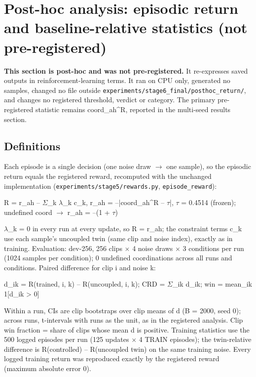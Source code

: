 \documentclass[conference]{IEEEtran}
\begin{document}
\section{Post-hoc analysis: episodic return and baseline-relative statistics (not pre-registered)}
\textbf{This section is post-hoc and was not pre-registered.} It re-expresses saved outputs in reinforcement-learning terms. It ran on CPU only, generated no samples, changed no file outside \texttt{experiments/stage6\_final/posthoc\_return/}, and changes no registered threshold, verdict or category. The primary pre-registered statistic remains coord\_ah\textasciicircum{}R, reported in the multi-seed results section.

\subsection{Definitions}
Each episode is a single decision (one noise draw $\rightarrow$ one sample), so the episodic return equals the registered reward, recomputed with the unchanged implementation (\texttt{experiments/stage5/rewards.py}, \texttt{episode\_reward}):

\begin{center}R = r\_ah -- $\Sigma$\_k $\lambda$\_k c\_k,   r\_ah = --|coord\_ah\textasciicircum{}R -- $\tau$|,   $\tau$ = 0.4514 (frozen);   undefined coord $\rightarrow$ r\_ah = --(1 + $\tau$)\end{center}
$\lambda$\_k = 0 in every run at every update, so R = r\_ah; the constraint terms c\_k use each sample's uncoupled twin (same clip and noise index), exactly as in training. Evaluation: dev-256, 256 clips $\times$ 4 noise draws $\times$ 3 conditions per run (1024 samples per condition); 0 undefined coordinations across all runs and conditions. Paired difference for clip i and noise k:

\begin{center}d\_ik = R(trained, i, k) -- R(uncoupled, i, k);   CRD = $\Sigma$\_ik d\_ik;   win = mean\_ik 1[d\_ik > 0]\end{center}
Within a run, CIs are clip bootstraps over clip means of d (B = 2000, seed 0); across runs, t-intervals with runs as the unit, as in the registered analysis. Clip win fraction = share of clips whose mean d is positive. Training statistics use the 500 logged episodes per run (125 updates $\times$ 4 TRAIN episodes); the twin-relative difference is R(controlled) -- R(uncoupled twin) on the same training noise. Every logged training return was reproduced exactly by the registered reward (maximum absolute error 0).
\end{document}
